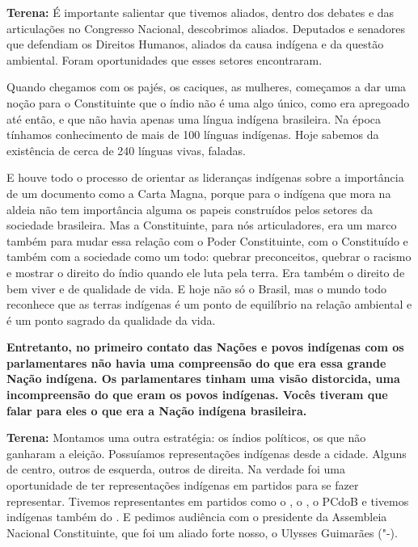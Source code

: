 \textbf{Terena:} É importante salientar que tivemos aliados, dentro dos
debates e das articulações no Congresso Nacional, descobrimos aliados.
Deputados e senadores que defendiam os Direitos Humanos, aliados da
causa indígena e da questão ambiental. Foram oportunidades que esses
setores encontraram.

Quando chegamos com os pajés, os caciques, as mulheres, começamos a dar
uma noção para o Constituinte que o índio não é uma algo único, como era
apregoado até então, e que não havia apenas uma língua indígena
brasileira. Na época tínhamos conhecimento de mais de 100 línguas
indígenas. Hoje sabemos da existência de cerca de 240 línguas vivas,
faladas.

E houve todo o processo de orientar as lideranças indígenas sobre a
importância de um documento como a Carta Magna, porque para o indígena
que mora na aldeia não tem importância alguma os papeis construídos
pelos setores da sociedade brasileira. Mas a Constituinte, para nós
articuladores, era um marco também para mudar essa relação com o Poder
Constituinte, com o Constituído e também com a sociedade como um todo:
quebrar preconceitos, quebrar o racismo e mostrar o direito do índio
quando ele luta pela terra. Era também o direito de bem viver e de
qualidade de vida. E hoje não só o Brasil, mas o mundo todo reconhece
que as terras indígenas é um ponto de equilíbrio na relação ambiental e
é um ponto sagrado da qualidade da vida.

\textbf{Entretanto, no primeiro contato das Nações e povos indígenas com
os parlamentares não havia uma compreensão do que era essa grande Nação
indígena. Os parlamentares tinham uma visão distorcida, uma
incompreensão do que eram os povos indígenas. Vocês tiveram que falar
para eles o que era a Nação indígena brasileira.}

\textbf{Terena:} Montamos uma outra estratégia: os índios políticos, os
que não ganharam a eleição. Possuíamos representações indígenas desde a
cidade. Alguns de centro, outros de esquerda, outros de direita. Na
verdade foi uma oportunidade de ter representações indígenas em partidos
para se fazer representar. Tivemos representantes em partidos como o ,
o , o PCdoB e tivemos indígenas também do . E pedimos audiência
com o presidente da Assembleia Nacional Constituinte, que foi um aliado
forte nosso, o Ulysses Guimarães ("-).

